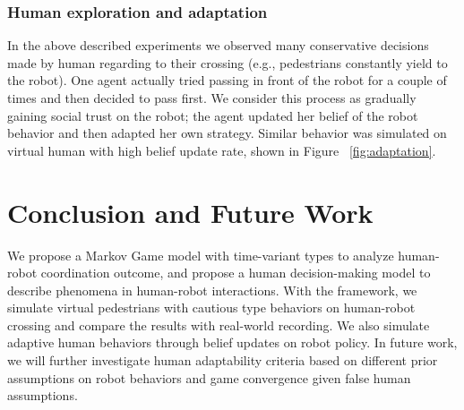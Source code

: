 \documentclass[letterpaper, 10 pt, conference]{ieeeconf}  %
\begin{document}
\subsubsection{Human exploration and adaptation}
In the above described experiments we observed many conservative decisions made by human regarding to their crossing (e.g., pedestrians constantly yield to the robot). One agent actually tried passing in front of the robot for a couple of times and then decided to pass first. We consider this process as gradually gaining social trust on the robot; the agent updated her belief of the robot behavior and then adapted her own strategy. Similar behavior was simulated on virtual human with high belief update rate, shown in Figure ~\ref{fig:adaptation}.   

\section{Conclusion and Future Work}
We propose a Markov Game model with time-variant types to analyze human-robot coordination outcome, and propose a human decision-making model to describe phenomena in human-robot interactions. With the framework, we simulate virtual pedestrians with cautious type behaviors on human-robot crossing and compare the results with real-world recording. We also simulate adaptive human behaviors through belief updates on robot policy. In future work, we will further investigate human adaptability criteria based on different prior assumptions on robot behaviors and game convergence given false human assumptions.
\vspace{-0.2em}


\end{document}
